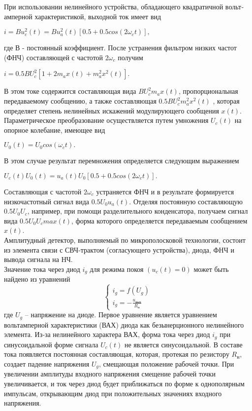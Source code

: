 \documentclass{bmstu}
\begin{document}
	При использовании нелинейного устройства, обладающего квадратичной 
	вольт‐амперной характеристикой, выходной ток имеет вид
	\begin{center}
		$i = B u_c^2(t) = Bu_a^2(t)[0.5 + 0.5 cos(2 \omega _c t)],$
	\end{center}
	
	где $В$ - постоянный коэффициент. После устранения фильтром низких частот
	(ФНЧ) составляющей с частотой $2\omega_c$ получим
	\begin{center}
		$i = 0.5 B U_c^2[1 + 2m_a x(t) + m_a^2 x^2(t)].$
	\end{center}
\indent	В этом токе содержится составляющая вида $BU_c^2m_ax(t)$, пропорциональная
	передаваемому сообщению, а также составляющая $0.5BU_c^2m_a^2x^2(t)$
	, которая определяет степень нелинейных искажений модулирующего сообщения
	$x(t)$. \\
	Параметрическое преобразование осуществляется путем умножения $U_c(t)$ на
	опорное колебание, имеющее вид 
	\begin{center}
		$U_0(t) = U_0 cos(\omega_c t).$
	\end{center}
	В этом случае результат перемножения определяется следующим выражением
	\begin{center}
		$U_c(t)U_0(t) = u_a(t)U_0[0.5 + 0.5cos(2\omega_c t)].$
	\end{center}
\indent	Составляющая с частотой $2\omega_c$ устраняется ФНЧ и в результате 
	формируется низкочастотный сигнал вида $0.5 U_0 u_a(t)$. Отделяя постоянную 
	составляющую $0.5 U_0 U_c$, например, при помощи разделительного конденсатора, 
	получаем сигнал вида $0.5 U_0 U_c max(t)$, форма которого определяется 
	передаваемым сообщением $x(t)$. \\
\indent	Амплитудный детектор, выполняемый по микрополосковой технологии, состоит из
	элемента связи с СВЧ‐трактом (согласующего устройства), диода, ФНЧ и вывода
	сигнала на НЧ. \\
\indent	Значение тока через диод $i_g$ для режима покоя $(u_c(t)=0)$ может быть 
	найдено из уравнений
	\begin{equation*}
		\begin{cases}
			 i_g = f(U_g)\\
			 i_g = - \frac{u_\text{вых}}{R_\text{н}}
		\end{cases}
	\end{equation*}
\indent	где $U_g$ – напряжение на диоде. Первое уравнение является уравнением 		
	вольтамперной характеристики (ВАХ) диода как безынерционного нелинейного 
	элемента. Из‐за нелинейного характера ВАХ, форма тока через диод $i_g$ при 
	синусоидальной форме сигнала $U_c(t)$ не является синусоидальной. В составе 
	тока появляется постоянная составляющая, которая, протекая по резистору 
	$R_\text{н}$, создает падение напряжения $U_g$, смещающая положение рабочей 
	точки. При увеличении амплитуды входного напряжения смещение рабочей точки 
	увеличивается, и ток через диод будет приближаться по форме к однополярным 
	импульсам, открывающим диод при положительных значениях входного напряжения.
	 
\end{document}
